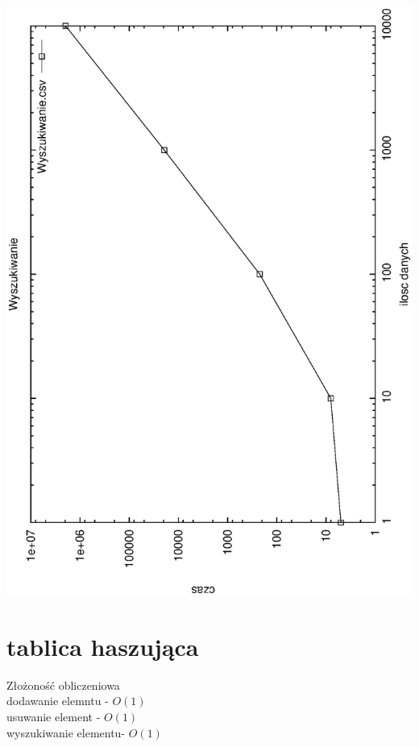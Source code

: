 \documentclass[a4paper,11pt]{report}
\begin{document}
\includegraphics[angle=270, scale = 0.5]{wykresy/wyszukiwanie.eps}
\newpage
\section{tablica haszująca}
Złożoność obliczeniowa\\ 
dodawanie elemntu - $O(1)$\\  
usuwanie  element - $O(1)$\\
wyszukiwanie elementu- $O(1)$\\
  
\end{document}
